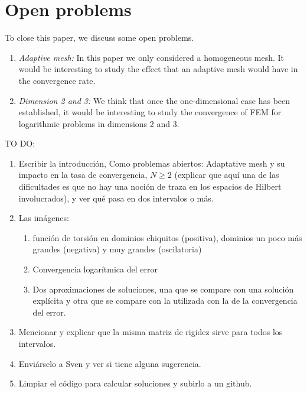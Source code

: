 \documentclass[11 pt]{article}
\numberwithin{equation}{section}
\begin{document}
\section{Open problems}\label{sec:o:p}

 To close this paper, we discuss some open problems.
 \begin{enumerate}
    \item \emph{Adaptive mesh:} In this paper we only considered a homogeneous mesh.  It would be interesting to study the effect that an adaptive mesh would have in the convergence rate.
     \item \emph{Dimension 2 and 3:} We think that once the one-dimensional case has been established, it would be interesting to study the convergence of FEM for logarithmic problems in dimensions 2 and 3.
 \end{enumerate}




 
 



\newpage

{\Huge  TO DO:}
\begin{enumerate}
    \item Escribir la introducción, Como problemas abiertos: Adaptative mesh y su impacto en la tasa de convergencia, $N\geq 2$ (explicar que aquí una de las dificultades es que no hay una noción de traza en los espacios de Hilbert involucrados), y ver qué pasa en dos intervalos o más.
    \item Las imágenes: 
    \begin{enumerate}
        \item función de torsión en dominios chiquitos (positiva), dominios un poco más grandes (negativa) y muy grandes (oscilatoria)
        \item Convergencia logarítmica del error
        \item Dos aproximaciones de soluciones, una que se compare con una solución explícita y otra que se compare con la utilizada con la de la convergencia del error.
    \end{enumerate}
    \item Mencionar y explicar que la misma matriz de rigidez sirve para todos los intervalos.
    \item Enviárselo a Sven y ver si tiene alguna sugerencia. 
    \item Limpiar el código para calcular soluciones y subirlo a un github.
\end{enumerate}
\end{document}
